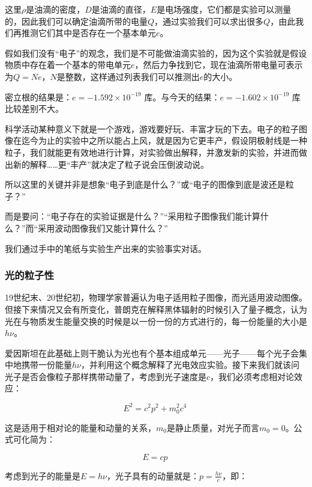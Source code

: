 这里$\rho$是油滴的密度，$D$是油滴的直径，$E$是电场强度，它们都是实验可以测量的，因此我们可以确定油滴所带的电量$Q$，通过实验我们可以求出很多$Q$，由此我们再推测它们其中是否存在一个基本单元$e$。

假如我们没有“电子”的观念，我们是不可能做油滴实验的，因为这个实验就是假设物质中存在着一个基本的带电单元$e$，然后力争找到它，现在油滴所带电量可表示为$ Q = N e$，$N$是整数，这样通过列表我们可以推测出$e$的大小。

密立根的结果是：$e = -1.592 \times 10^{-19}$ 库。与今天的结果：$e = -1.602 \times 10^{-19}$ 库比较差别不大。

科学活动某种意义下就是一个游戏，游戏要好玩、丰富才玩的下去。电子的粒子图像在迄今为止的实验中之所以能占上风，就是因为它更丰产，假设阴极射线是一种粒子，我们就能更有效地进行计算，对实验做出解释，并激发新的实验，并进而做出新的解释……更“丰产”就决定了粒子说会压倒波动说。

所以这里的关键并非是想象“电子到底是什么？”或“电子的图像到底是波还是粒子？”

而是要问：“电子存在的实验证据是什么？”“采用粒子图像我们能计算什么？”而“采用波动图像我们又能计算什么？”

我们通过手中的笔纸与实验生产出来的实验事实对话。


\subsubsection{光的粒子性}

19世纪末、20世纪初，物理学家普遍认为电子适用粒子图像，而光适用波动图像。但接下来情况又会有所变化，普朗克在解释黑体辐射的时候引入了量子概念，认为光在与物质发生能量交换的时候是以一份一份的方式进行的，每一份能量的大小是$h \nu$。

爱因斯坦在此基础上则干脆认为光也有个基本组成单元——光子——每个光子会集中地携带一份能量$h \nu$，并利用这个概念解释了光电效应实验。接下来我们就该问光子是否会像粒子那样携带动量了，考虑到光子速度是$c$，我们必须考虑相对论效应：

\begin{equation}
E^2 = c^2 p^2 + m_0^2 c^4~
\end{equation}

这是适用于相对论的能量和动量的关系，$m_0$是静止质量，对光子而言$m_0 = 0$。公式可化简为：

\begin{equation}
E = cp~
\end{equation}

考虑到光子的能量是$E = h \nu$，光子具有的动量就是：$p = \frac{h \nu }{ c }$，即：

